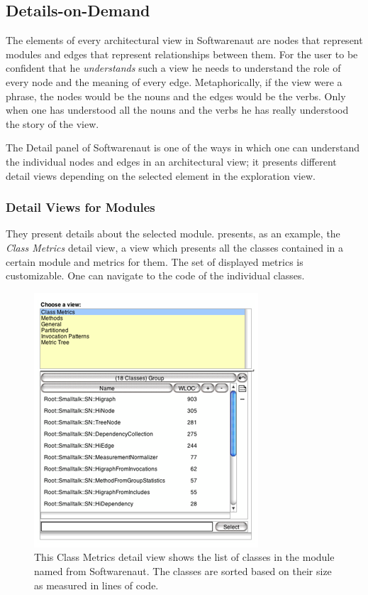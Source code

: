 \documentclass[preprint,12pt]{elsarticle}
\begin{document}
\newpage
\subsection {Details-on-Demand}


The elements of every architectural view in Softwarenaut are nodes that represent modules and edges that represent relationships between them. For the user to be confident that he {\em understands} such a view he needs to understand the role of every node and the meaning of every edge. Metaphorically, if the view were a phrase, the nodes would be the nouns and the edges would be the verbs. Only when one has understood all the nouns and the verbs he has really understood the story of the view.  

The Detail panel of Softwarenaut is one of the ways in which one can understand the individual nodes and edges in an architectural view; it presents different detail views depending on the selected element in the exploration view. %



\subsubsection {Detail Views for Modules}
They present details about the selected module.  presents, as an example, the {\em Class Metrics} detail view, a view which presents all the classes contained in a certain module and metrics for them. The set of displayed metrics is customizable. One can navigate to the code of the individual classes. 

\begin{figure}[h]
\begin{center}
\includegraphics[width=0.43\linewidth]{images/DetailForNode.png}
\caption{This Class Metrics detail view shows the list of classes in the module named  from Softwarenaut. The classes are sorted based on their size as measured in lines of code.}

\end{center}
\end{figure}
\end{document}
